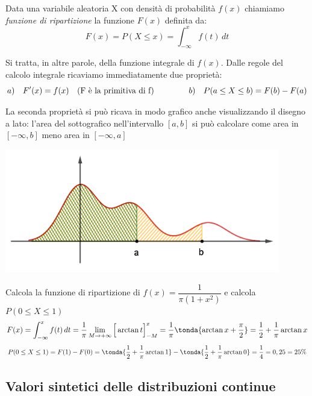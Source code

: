 \begin{definizione} Data una variabile aleatoria X con densità di probabilità \(f(x)\) chiamiamo \emph{funzione di ripartizione} la funzione \(F(x)\) definita da:
\[F(x) = P(X\leq x) = \int_{-\infty}^x f(t) \,dt\]
\end{definizione}
Si tratta, in altre parole, della funzione integrale di \(f(x)\). Dalle regole del calcolo integrale ricaviamo immediatamente due proprietà:
\[a) \quad F'(x) = f(x) \quad \text{(F è la primitiva di f)} \hspace{1.5cm} b) \quad P(a \leq X \leq b) = F(b)-F(a)\]
\begin{minipage}[c]{.45\textwidth}
La seconda proprietà si può ricava in modo grafico anche visualizzando il disegno a lato: l'area del sottografico nell'intervallo \([a,b]\) si può calcolare come area in \([-\infty,b]\) meno area in \([-\infty,a]\)
\end{minipage}
\begin{minipage}[c]{.55\textwidth}
\begin{center}
  \includegraphics[width=0.9\textwidth]{img/FormulaAree.png}
\end{center}
\end{minipage}

\begin{esempio} Calcola la funzione di ripartizione di \(f(x)=\dfrac{1}{\pi (1+x^2)}\) e calcola \(P(0 \leq X \leq 1)\)
\[F(x) = \int_{-\infty}^x f(t) \, dt = \dfrac{1}{\pi} \lim_{M \rightarrow +\infty} \Big[\arctan{t}\Big]_{-M}^x = \dfrac{1}{\pi} \tonda{\arctan{x}+\dfrac{\pi}{2}} =  \dfrac{1}{2}+\dfrac{1}{\pi} \arctan x\]
\[P(0\leq X \leq 1) = F(1)-F(0) = \tonda{\dfrac{1}{2}+\dfrac{1}{\pi} \arctan 1}-\tonda{\dfrac{1}{2}+\dfrac{1}{\pi} \arctan 0} = \dfrac{1}{4} = 0,25 = 25\%\]
\end{esempio}

\subsection{Valori sintetici delle distribuzioni continue}


